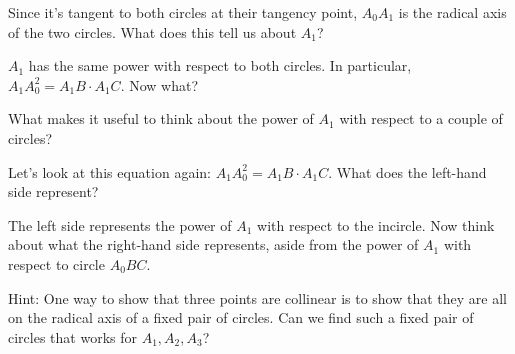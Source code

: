 


Since it's tangent to both circles at their tangency point, $A_0A_1$ is the radical axis of the two circles. What does this tell us about $A_1$?





$A_1$ has the same power with respect to both circles. In particular, $A_1A_0^2 = A_1B\cdot A_1C$. Now what?

What makes it useful to think about the power of $A_1$ with respect to a couple of circles?

Let's look at this equation again: $A_1A_0^2 = A_1B\cdot A_1C$. What does the left-hand side represent?


The left side represents the power of $A_1$ with respect to the incircle. Now think about what the right-hand side represents, aside from the power of $A_1$ with respect to circle $A_0BC$.

Hint: One way to show that three points are collinear is to show that they are all on the radical axis of a fixed pair of circles. Can we find such a fixed pair of circles that works for $A_1, A_2, A_3$?



